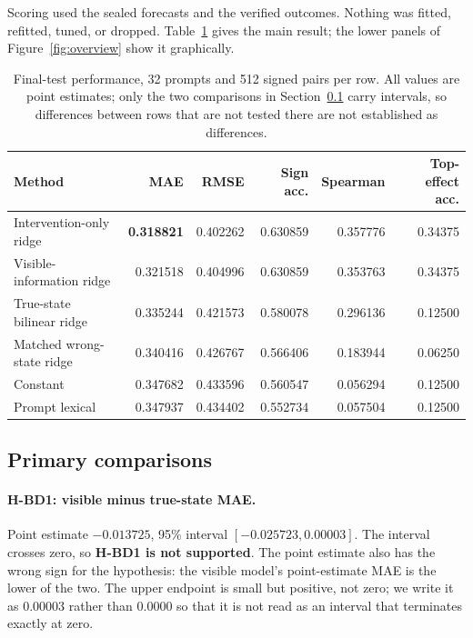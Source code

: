 \documentclass{article}
\begin{document}
Scoring used the sealed forecasts and the verified outcomes. Nothing was fitted, refitted, tuned, or
dropped. Table~\ref{tab:main} gives the main result; the lower panels of Figure~\ref{fig:overview}
show it graphically.

\begin{table}[htbp]
\centering
\small
\begin{tabular}{lrrrrr}
\toprule
Method & MAE & RMSE & Sign acc. & Spearman & Top-effect acc. \\
\midrule
Intervention-only ridge   & \textbf{0.318821} & 0.402262 & 0.630859 & 0.357776 & 0.34375 \\
Visible-information ridge & 0.321518 & 0.404996 & 0.630859 & 0.353763 & 0.34375 \\
True-state bilinear ridge & 0.335244 & 0.421573 & 0.580078 & 0.296136 & 0.12500 \\
Matched wrong-state ridge & 0.340416 & 0.426767 & 0.566406 & 0.183944 & 0.06250 \\
Constant                  & 0.347682 & 0.433596 & 0.560547 & 0.056294 & 0.12500 \\
Prompt lexical            & 0.347937 & 0.434402 & 0.552734 & 0.057504 & 0.12500 \\
\bottomrule
\end{tabular}
\caption{Final-test performance, 32 prompts and 512 signed pairs per row. All values are point
estimates; only the two comparisons in Section~\ref{sec:primary} carry intervals, so differences
between rows that are not tested there are not established as differences.}
\label{tab:main}
\end{table}

\subsection{Primary comparisons}
\label{sec:primary}

\paragraph{H-BD1: visible minus true-state MAE.}
Point estimate $-0.013725$, 95\% interval $[-0.025723, 0.00003]$. The interval crosses zero, so
\textbf{H-BD1 is not supported}. The point estimate also has the wrong sign for the hypothesis: the
visible model's point-estimate MAE is the lower of the two. The upper endpoint is small but
positive, not zero; we write it as $0.00003$ rather than $0.0000$ so that it is not read as an
interval that terminates exactly at zero.
\end{document}
